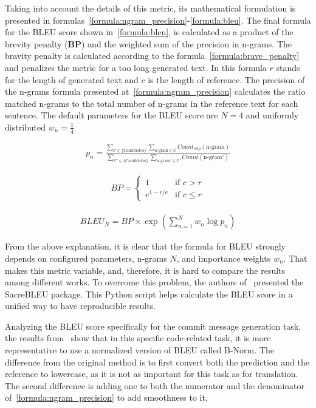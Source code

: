 Taking into account the details of this metric, its mathematical formulation is presented in formulas~\ref{formula:ngram_precision}-\ref{formula:bleu}. The final formula for the BLEU score shown in~\ref{formula:bleu}, is calculated as a product of the brevity penalty (\textbf{BP}) and the weighted sum of the precision in n-grams. The bravity penalty is calculated according to the formula~\ref{formula:brave_penalty} and penalizes the metric for a too long generated text. In this formula $r$ stands for the length of generated text and $c$ is the length of reference. The precision of the n-grams formula presented at~\ref{formula:ngram_precision} calculates the ratio matched n-grams to the total number of n-grams in the reference text for each sentence. The default parameters for the BLEU score are $N=4$ and uniformly distributed $w_n = \frac{1}{4}$

\begin{align}\label{formula:ngram_precision}
    p_n = \frac{\sum_{\mathcal{C} \in \text{\{Candidates\}}} \sum_{\text{n-gram} \in \mathcal{C}} Count_{clip}(\text{n-gram})}
    {\sum_{\mathcal{C}' \in \text{\{Candidates\}}} \sum_{\text{n-gram}' \in \mathcal{C}'} Count(\text{n-gram}')}
\end{align}

\begin{align}\label{formula:brave_penalty}
    BP = \begin{cases}
        1 & \text{if } c > r \\ 
        e^{1 - r/c} & \text{if } c \leq r
    \end{cases}
\end{align}

\begin{align}\label{formula:bleu}
    BLEU_N = BP \times \exp{\left( \sum_{n=1}^{N} w_n \log p_n\right)}
\end{align}

From the above explanation, it is clear that the formula for BLEU strongly depends on configured parameters, n-grams $N$, and importance weights $w_n$. That makes this metric variable, and, therefore, it is hard to compare the results among different works. To overcome this problem, the authors of~\cite{post2018call} presented the SacreBLEU package. This Python script helps calculate the BLEU score in a unified way to have reproducible results.

Analyzing the BLEU score specifically for the commit message generation task, the results from~\cite{tao2021evaluation} show that in this specific code-related task, it is more representative to use a normalized version of BLEU called B-Norm. The difference from the original method is to first convert both the prediction and the reference to lowercase, as it is not as important for this task as for translation. The second difference is adding one to both the numerator and the denominator of~\ref{formula:ngram_precision} to add smoothness to it.

